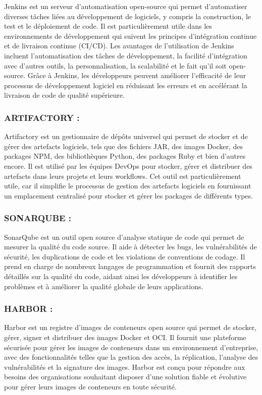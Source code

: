 Jenkins est un serveur d’automatisation open-source qui permet d’automatiser diverses tâches liées au développement de logiciels, y compris la construction, le test et le déploiement de code. Il est particulièrement utile dans les environnements de développement qui suivent les principes d’intégration continue et de livraison continue (CI/CD). Les avantages de l’utilisation de Jenkins incluent l’automatisation des tâches de développement, la facilité d’intégration avec d’autres outils, la personnalisation, la scalabilité et le fait qu’il soit open-source. Grâce à Jenkins, les développeurs peuvent améliorer l’efficacité de leur processus de développement logiciel en réduisant les erreurs et en accélérant la livraison de code de qualité supérieure.
\subsubsection{ARTIFACTORY :}

Artifactory est un gestionnaire de dépôts universel qui permet de stocker et de gérer des artefacts logiciels, tels que des fichiers JAR, des images Docker, des packages NPM, des bibliothèques Python, des packages Ruby et bien d’autres encore. Il est utilisé par les équipes DevOps pour stocker, gérer et distribuer des artefacts dans leurs projets et leurs workflows. Cet outil est particulièrement utile, car il simplifie le processus de gestion des artefacts logiciels en fournissant un emplacement centralisé pour stocker et gérer les packages de différents types.

\subsubsection{SONARQUBE :}

SonarQube est un outil open source d’analyse statique de code qui permet de mesurer la qualité du code source. Il aide à détecter les bugs, les vulnérabilités de sécurité, les duplications de code et les violations de conventions de codage. Il prend en charge de nombreux langages de programmation et fournit des rapports détaillés sur la qualité du code, aidant ainsi les développeurs à identifier les problèmes et à améliorer la qualité globale de leurs applications.

\subsubsection{HARBOR :}

Harbor est un registre d’images de conteneurs open source qui permet de stocker, gérer, signer et distribuer des images Docker et OCI. Il fournit une plateforme sécurisée pour gérer les images de conteneurs dans un environnement d’entreprise, avec des fonctionnalités telles que la gestion des accès, la réplication, l’analyse des vulnérabilités et la signature des images. Harbor est conçu pour répondre aux besoins des organisations souhaitant disposer d’une solution fiable et évolutive pour gérer leurs images de conteneurs en toute sécurité.


